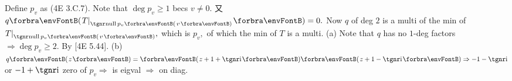 %


Define $p_v$ as (4E 3.C.7). Note that $\deg p_v\geqslant 1$ becs $v\neq 0.$ 又 $q\Par{T\mmid_{\nullp p_v\SmallPar{v}}}=0.$\parSol{}
Now $q$ of deg $2$ is a multi of the min of $T\mmid_{\nullp p_v\SmallPar{v}},$ which is $p_v,$ of which the min of $T$ is a multi.\parSol{}
(a) Note that $q$ has no $1$\hspace{1pt}-\hspace{1pt}deg factors $\Rightarrow\deg p_v\geqslant 2.$ By [4E 5.44].\parSol{}
(b) $q\Par{z}=\Par{z+1+\i}\Par{z+1-\i}\Rightarrow -1-\i$ or $-1+\i$ zero of $p_v\Rightarrow$ is eigval $\Rightarrow$ on diag.\PfEnd
\SepLine



